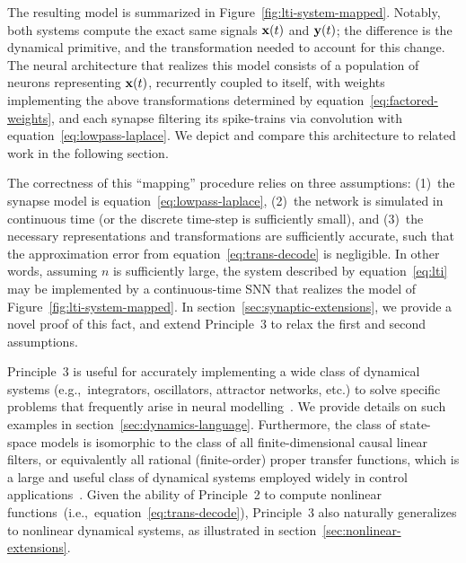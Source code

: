 The resulting model is summarized in Figure~\ref{fig:lti-system-mapped}.
Notably, both systems compute the exact same signals $\mathbf{x}(t)$ and $\mathbf{y}(t)$; the difference is the dynamical primitive, and the transformation needed to account for this change.
The neural architecture that realizes this model consists of a population of neurons representing $\mathbf{x}(t)$, recurrently coupled to itself, with weights implementing the above transformations determined by equation~\ref{eq:factored-weights}, and each synapse filtering its spike-trains via convolution with equation~\ref{eq:lowpass-laplace}.
We depict and compare this architecture to related work in the following section.

The correctness of this ``mapping'' procedure relies on three assumptions: (1)~the synapse model is equation~\ref{eq:lowpass-laplace}, (2)~the network is simulated in continuous time (or the discrete time-step is sufficiently small), and (3)~the necessary representations and transformations are sufficiently accurate, such that the approximation error from equation~\ref{eq:trans-decode} is negligible.
In other words, assuming $n$ is sufficiently large, the system described by equation~\ref{eq:lti} may be implemented by a continuous-time SNN that realizes the model of Figure~\ref{fig:lti-system-mapped}.
In section~\ref{sec:synaptic-extensions}, we provide a novel proof of this fact, and extend Principle~3 to relax the first and second assumptions.

Principle~3 is useful for accurately implementing a wide class of dynamical systems (e.g.,~integrators, oscillators, attractor networks, etc.) to solve specific problems that frequently arise in neural modelling~\citep[e.g.,][]{eliasmith2000b, singh2004, eliasmith2005b, singh2006}.
We provide details on such examples in section~\ref{sec:dynamics-language}.
Furthermore, the class of state-space models is isomorphic to the class of all finite-dimensional causal linear filters, or equivalently all rational (finite-order) proper transfer functions, which is a large and useful class of dynamical systems employed widely in control applications~\citep{brogan1982modern}.
Given the ability of Principle~2 to compute nonlinear functions~(i.e.,~equation~\ref{eq:trans-decode}), Principle~3 also naturally generalizes to nonlinear dynamical systems, as illustrated in section~\ref{sec:nonlinear-extensions}.

